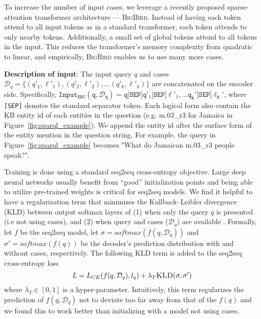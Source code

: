 \documentclass[11pt]{article}
\newcommand{\bigb}{\textsc{BigBird}\xspace}
\begin{document}
To increase the number of input cases, we leverage a recently proposed sparse-attention transformer architecture --- \bigb \cite{zaheer2020big}. Instead of having each token attend to all input tokens as in a standard transformer, each token attends to only nearby tokens. Additionally, a small set of global tokens attend to all tokens in the input. This reduces the transformer's memory complexity from quadratic to linear, and empirically, \bigb enables us to use many more cases.

\textbf{Description of input}: The input query $q$ and cases $\mathcal{D}_q = \{(q'_1, \ell'_1), (q'_2, \ell'_2), \ldots (q'_k, \ell'_k)\}$ are concatenated on the encoder side. Specifically, $\mathtt{Input_{ENC}(q, \mathcal{D}_q)} = \mathtt{q} \texttt{[SEP]} \mathtt{q}'_1 \texttt{[SEP]} \mathtt{\ell}'_1, \ldots \mathtt{q_k}' \texttt{[SEP]} \mathtt{\ell_k}'$, where \texttt{[SEP]} denotes the standard separator token. Each logical form also contain the KB entity id of each entities in the question (e.g. m.03\_r3 for Jamaica in Figure~\ref{fig:sparql_example}). We append the entity id after the surface form of the entity mention in the question string. For example, the query in Figure~\ref{fig:sparql_example} becomes "What do Jamaican m.03\_r3 people speak?".


Training is done using a standard seq2seq cross-entropy objective. Large deep neural networks usually benefit from ``good'' initialization points \citep{frankle2019lottery} and being able to utilize pre-trained weights is critical for seq2seq models. We find it helpful to have a regularization term that minimizes the Kullback–Leibler divergence (KLD) between output softmax layers of (1) when only the query $q$ is presented (i.e not using cases), and (2) when query and cases ($\mathcal{D}_q$) are available \cite{yu2013kl}.
Formally, let $f$ be the seq2seq model, let $\sigma = softmax(f(q, \mathcal{D}_q))$ and $\sigma' = softmax(f(q))$ be the decoder's prediction distribution with and without cases, respectively. The following KLD term is added to the seq2seq cross-entropy loss
\begin{equation*}
    L = L_{CE}(f(q, \mathcal{D}_q), l_q) + \lambda_T \textsc{KLD}(\sigma, \sigma')
\end{equation*}
 where $\lambda_T \in [0,1]$ is a hyper-parameter. Intuitively, this term regularizes the prediction of $f(q, \mathcal{D}_q)$ not to deviate too far away from that of the $f(q)$ and we found this to work better than initializing with a model not using cases.
\end{document}
